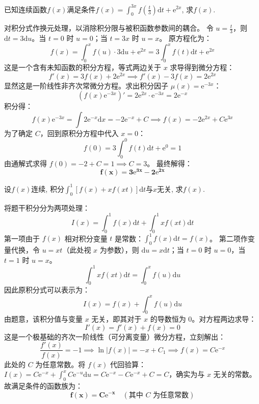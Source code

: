 \documentclass[lang=cn,11pt]{elegantbook}
\begin{document}
\begin{exercise}[积分方程求未知函数]
已知连续函数$f(x)$满足条件$\displaystyle f(x) = \int_{0}^{3x} f\left(\frac{t}{3}\right)\mathrm{d}t + \mathrm{e}^{2x}$, 求$f(x)$.
\end{exercise}
\begin{solution}
对积分式作换元处理，以消除积分限与被积函数参数间的耦合。
令 $u = \frac{t}{3}$，则 $\mathrm{d}t = 3\mathrm{d}u$。当 $t=0$ 时 $u=0$；当 $t=3x$ 时 $u=x$。
原方程化为：
\[
f(x) = \int_{0}^{x} f(u) \cdot 3\mathrm{d}u + \mathrm{e}^{2x} = 3\int_{0}^{x} f(t)\mathrm{d}t + \mathrm{e}^{2x}
\]
这是一个含有未知函数的积分方程，等式两边关于 $x$ 求导得到微分方程：
\[
f'(x) = 3f(x) + 2\mathrm{e}^{2x} \implies f'(x) - 3f(x) = 2\mathrm{e}^{2x}
\]
显然这是一阶线性非齐次常微分方程。求出积分因子 $\mu(x) = \mathrm{e}^{-3x}$：
\[
(f(x)\mathrm{e}^{-3x})' = 2\mathrm{e}^{2x} \cdot \mathrm{e}^{-3x} = 2\mathrm{e}^{-x}
\]
积分得：
\[
f(x)\mathrm{e}^{-3x} = \int 2\mathrm{e}^{-x}\mathrm{d}x = -2\mathrm{e}^{-x} + C \implies f(x) = -2\mathrm{e}^{2x} + C\mathrm{e}^{3x}
\]
为了确定 $C$，回到原积分方程中代入 $x=0$：
\[
f(0) = 3\int_{0}^{0} f(t)\mathrm{d}t + \mathrm{e}^{0} = 1
\]
由通解式求得 $f(0) = -2 + C = 1 \implies C = 3$。
最终解得：
\[
\mathbf{f(x) = 3\mathrm{e}^{3x} - 2\mathrm{e}^{2x}}
\]
\end{solution}

\begin{exercise}[积分与变量无关]
设$f(x)$连续, 积分$\displaystyle \int_{0}^{1} [f(x) + xf(xt)]\mathrm{d}t$与$x$无关, 求$f(x)$.
\end{exercise}
\begin{solution}
将题干积分分为两项处理：
\[
I(x) = \int_{0}^{1} f(x)\mathrm{d}t + \int_{0}^{1} xf(xt)\mathrm{d}t
\]
第一项由于 $f(x)$ 相对积分变量 $t$ 是常数：$\int_{0}^{1} f(x)\mathrm{d}t = f(x)$。
第二项作变量代换，令 $u = xt$（此处视 $x$ 为参数），则 $\mathrm{d}u = x\mathrm{d}t$；当 $t=0$ 时 $u=0$，当 $t=1$ 时 $u=x$。
\[
\int_{0}^{1} xf(xt)\mathrm{d}t = \int_{0}^{x} f(u)\mathrm{d}u
\]
因此原积分式可以表示为：
\[
I(x) = f(x) + \int_{0}^{x} f(u)\mathrm{d}u
\]
由题意，该积分值与变量 $x$ 无关，即其对于 $x$ 的导数恒为 0。对方程两边求导：
\[
I'(x) = f'(x) + f(x) = 0
\]
这是一个极基础的齐次一阶线性（可分离变量）微分方程，立刻解出：
\[
\frac{f'(x)}{f(x)} = -1 \implies \ln|f(x)| = -x + C_1 \implies f(x) = C\mathrm{e}^{-x}
\]
此处的 $C$ 为任意常数。将 $f(x)$ 代回验算：$I(x) = C\mathrm{e}^{-x} + \int_0^x C\mathrm{e}^{-u}\mathrm{d}u = C\mathrm{e}^{-x} - C\mathrm{e}^{-x} + C = C$，确实为与 $x$ 无关的常数。
故满足条件的函数族为：
\[
\mathbf{f(x) = C\mathrm{e}^{-x}} \quad (\text{其中 } C \text{ 为任意常数})
\]
\end{solution}
\end{document}
